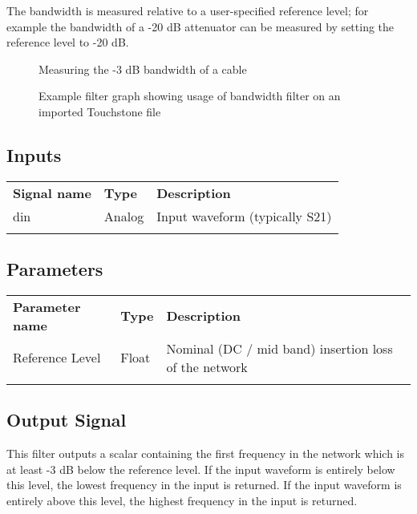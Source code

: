 The bandwidth is measured relative to a user-specified reference level; for example the bandwidth of a -20 dB
attenuator can be measured by setting the reference level to -20 dB.

\begin{figure}[h]
\centering
{}
\caption{Measuring the -3 dB bandwidth of a cable}
\label{filter_bandwidth}
\end{figure}

\begin{figure}[h]
\centering
{}
\caption{Example filter graph showing usage of bandwidth filter on an imported Touchstone file}
\label{filter_graph_bandwidth}
\end{figure}
\FloatBarrier

\subsection{Inputs}

\begin{tabularx}{16cm}{llX}
\thickhline
\textbf{Signal name} & \textbf{Type} & \textbf{Description} \\
\thickhline
din & Analog & Input waveform (typically S21) \\
\thickhline
\end{tabularx}

\subsection{Parameters}

\begin{tabularx}{16cm}{llX}
\thickhline
\textbf{Parameter name} & \textbf{Type} & \textbf{Description} \\
\thickhline
Reference Level & Float & Nominal (DC / mid band) insertion loss of the network\\
\thickhline
\end{tabularx}

\subsection{Output Signal}

This filter outputs a scalar containing the first frequency in the network which is at least -3 dB below the reference
level. If the input waveform is entirely below this level, the lowest frequency in the input is returned. If the
input waveform is entirely above this level, the highest frequency in the input is returned.

